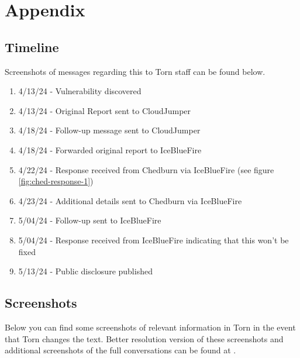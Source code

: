 \documentclass{article}
\begin{document}
{\newpage
\section{Appendix}
\subsection{Timeline} \label{sec:timeline}
\par{Screenshots of messages regarding this to Torn staff can be found below.}

\begin{enumerate}
	\item 4/13/24 - Vulnerability discovered
	\item 4/13/24 - Original Report sent to CloudJumper
	\item 4/18/24 - Follow-up message sent to CloudJumper
	\item 4/18/24 - Forwarded original report to IceBlueFire
	\item 4/22/24 - Response received from Chedburn via IceBlueFire (see figure \ref{fig:ched-response-1})
	\item 4/23/24 - Additional details sent to Chedburn via IceBlueFire
	\item 5/04/24 - Follow-up sent to IceBlueFire
	\item 5/04/24 - Response received from IceBlueFire indicating that this won't be fixed
	\item 5/13/24 - Public disclosure published
\end{enumerate}

\subsection{Screenshots}
\par{Below you can find some screenshots of relevant information in Torn in the event that Torn changes the text. Better resolution version of these screenshots and additional screenshots of the full conversations can be found at \url{}.}

}
\end{document}
